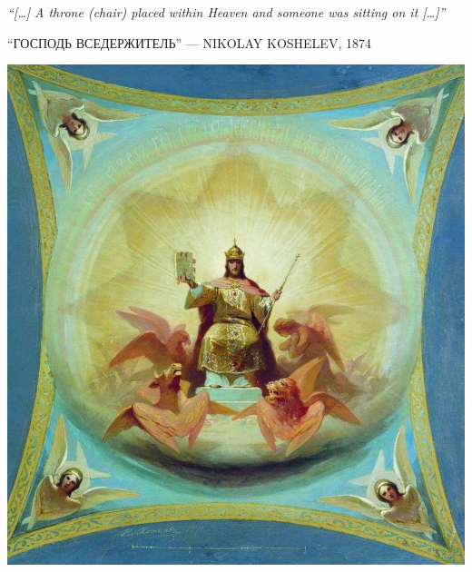 \clearpage
\thispagestyle{empty}
\null\vfill
\settowidth{}
\begin{center}
\parbox{\longest}{%
  \raggedright{\huge\itshape%
    ``[…] A throne (chair) placed within Heaven and someone was sitting on it […]'' \par\bigskip
  }
  \raggedleft\Large\MakeUppercase{``Господь Вседержитель'' — Nikolay Koshelev, 1874}\par%
}
\vfill\vfill
\clearpage\newpage
\end{center}
\newpage
\thispagestyle{empty}
\begin{center}
	\includegraphics[width=1\textwidth]{images/illustrations/christpantokrator.jpg}
\end{center}